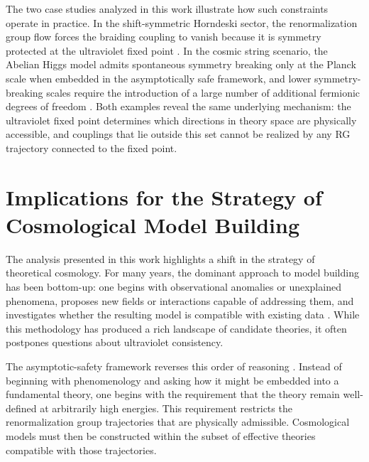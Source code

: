 \documentclass[12pt,a4paper]{article}
\begin{document}
The two case studies analyzed in this work illustrate how such constraints
operate in practice. In the shift-symmetric Horndeski sector, the renormalization
group flow forces the braiding coupling to vanish because it is symmetry
protected at the ultraviolet fixed point \cite{EichhornLinoWagner2023}. In the
cosmic string scenario, the Abelian Higgs model admits spontaneous symmetry
breaking only at the Planck scale when embedded in the asymptotically safe
framework, and lower symmetry-breaking scales require the introduction of a
large number of additional fermionic degrees of freedom
\cite{EichhornLinoMiqueleto2023}. Both examples reveal the same underlying
mechanism: the ultraviolet fixed point determines which directions in theory
space are physically accessible, and couplings that lie outside this set cannot
be realized by any RG trajectory connected to the fixed point.

\section{Implications for the Strategy of Cosmological Model Building}

The analysis presented in this work highlights a shift in the strategy of
theoretical cosmology. For many years, the dominant approach to model building
has been bottom-up: one begins with observational anomalies or unexplained
phenomena, proposes new fields or interactions capable of addressing them, and
investigates whether the resulting model is compatible with existing data
\cite{Clifton2012,Dodelson2003,Weinberg2008}. While this methodology has
produced a rich landscape of candidate theories, it often postpones questions
about ultraviolet consistency.

The asymptotic-safety framework reverses this order of reasoning
\cite{Weinberg1979,Eichhorn2019,EichhornSchiffer2022handbook}. Instead of
beginning with phenomenology and asking how it might be embedded into a
fundamental theory, one begins with the requirement that the theory remain
well-defined at arbitrarily high energies. This requirement restricts the
renormalization group trajectories that are physically admissible. Cosmological
models must then be constructed within the subset of effective theories
compatible with those trajectories.
\end{document}
